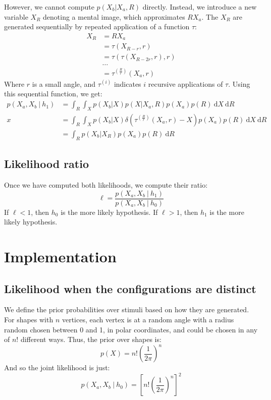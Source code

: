 \documentclass{article} %
\begin{document}
However, we cannot compute $p(X_b\vert X_a, R)$ directly. Instead, we
introduce a new variable $X_R$ denoting a mental image, which
approximates $RX_a$. The $X_R$ are generated sequentially by repeated
application of a function $\tau$:
\begin{align*}
  X_R&=RX_a\\
  &=\tau(X_{R-r}, r)\\
  &=\tau(\tau(X_{R-2r}, r), r)\\
  &\ldots{}\\
  &=\tau^{(\frac{R}{r})}(X_a, r)
\end{align*} 
Where $r$ is a small angle, and $\tau^{(i)}$ indicates $i$ recursive
applications of $\tau$. Using this sequential function, we get:
\begin{align}
  p(X_a, X_b\ \vert \ h_1)&=\int_R \int_{X} p(X_b\vert X) p(X\vert X_a, R)p(X_a)p(R)\ \mathrm{d}X\ \mathrm{d}R \nonumber \\
  x&= \int_R \int_X p(X_b\vert X)\delta(\tau^{(\frac{R}{r})}(X_a, r)-X)p(X_a)p(R)\ \mathrm{d}X\ \mathrm{d}R \nonumber \\
  &= \int_R p(X_b\vert X_R)p(X_a)p(R)\ \mathrm{d}R
\end{align}

\subsection{Likelihood ratio}

Once we have computed both likelihoods, we compute their ratio:
\begin{equation}
  \ell=\frac{p(X_a, X_b\ \vert \ h_1)}{p(X_a, X_b\ \vert \ h_0)}
\end{equation} 
If $\ell<1$, then $h_0$ is the more likely hypothesis. If $\ell>1$,
then $h_1$ is the more likely hypothesis.

\section{Implementation}

\subsection{Likelihood when the configurations are distinct}

We define the prior probabilities over stimuli based on how they are
generated. For shapes with $n$ vertices, each vertex is at a random
angle with a radius random chosen between 0 and 1, in polar
coordinates, and could be chosen in any of $n!$ different ways. Thus,
the prior over shapes is:
\begin{equation}
  p(X)=n!\left(\frac{1}{2\pi}\right)^n
\end{equation} 
And so the joint likelihood is just:
\begin{equation}
  p(X_a, X_b\ \vert \ h_0)=\left[n!\left(\frac{1}{2\pi}\right)^n\right]^2
\end{equation}
\end{document}
